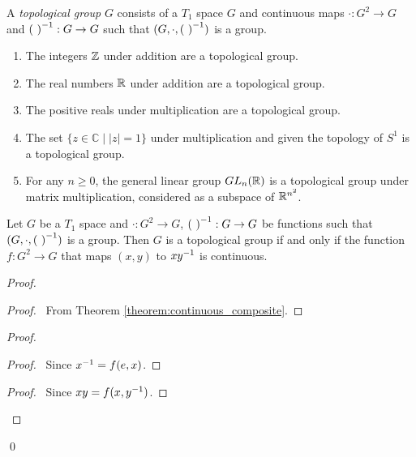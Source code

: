\begin{definition}
    A \emph{topological group} $G$ consists of a $T_1$ space $G$ and continuous maps
    $\cdot : G^2 \rightarrow G$ and ${(\ )}^{-1} : G \rightarrow G$ such that $(G, \cdot, \inv{(\ )})$
    is a group.
\end{definition}

\begin{example}
    \begin{enumerate}
        \item The integers $\mathbb{Z}$ under addition are a topological group.
        \item The real numbers $\mathbb{R}$ under addition are a topological group.
        \item The positive reals under multiplication are a topological group.
        \item The set $\{ z \in \mathbb{C} \mid |z| = 1 \}$ under multiplication
        and given the topology of $S^1$ is a topological group.
        \item For any $n \geq 0$, the general linear group $GL_n(\mathbb{R})$ is a topological
        group under matrix multiplication, considered as a subspace of $\mathbb{R}^{n^2}$.
    \end{enumerate}
\end{example}

\begin{lemma}
    Let $G$ be a $T_1$ space and $\cdot : G^2 \rightarrow G$, ${(\ )}^{-1} : G \rightarrow G$
    be functions such that $(G, \cdot, \inv{(\ )})$ is a group. Then $G$ is a
    topological group if and only if the function $f : G^2 \rightarrow G$ that maps
    $(x,y)$ to $x {y}^{-1}$ is continuous.
\end{lemma}

\begin{proof}
    \pf
    \begin{proof}
        \pf\ From Theorem \ref{theorem:continuous_composite}.
    \end{proof}
    \begin{proof}
        \begin{proof}
            \pf\ Since ${x}^{-1} = f(e,x)$.
        \end{proof}
        \begin{proof}
            \pf\ Since $xy = f(x,{y}^{-1})$.
        \end{proof}
    \end{proof}
    \qed
\end{proof}

